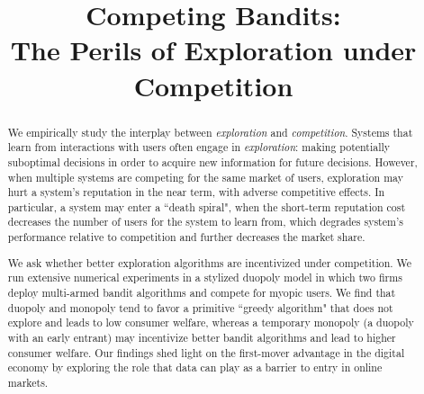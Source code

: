 \documentclass[format=acmsmall, review=false]{acmart}
\theoremstyle{definition}
\begin{document}
\title[Competing Bandits: The Perils of Exploration under Competition]
{Competing Bandits: \\ The Perils of Exploration under Competition}



\begin{abstract}
  We empirically study the interplay between \textit{exploration} and
  \textit{competition}. Systems that learn from interactions with
  users often engage in \emph{exploration}: making potentially
  suboptimal decisions in order to acquire new information for future
  decisions. However, when multiple systems are competing for
    the same market of users, exploration may hurt a system's
    reputation in the near term, with adverse competitive effects. In particular, a system may enter a ``death spiral", when the short-term reputation cost decreases
    the number of users for the system to learn from, which degrades
    system's performance relative to competition and further decreases
    the market share.

We ask whether better exploration algorithms are incentivized under competition. We run extensive numerical experiments in a stylized duopoly model in which two firms deploy multi-armed bandit algorithms and compete for myopic users.  We find that duopoly and monopoly tend to favor a primitive ``greedy algorithm" that does not explore and leads to low consumer welfare, whereas a temporary monopoly (a duopoly with an early entrant) may incentivize better bandit algorithms and lead to higher consumer welfare. Our findings shed light on the first-mover advantage in the digital economy by exploring the role that data can play as a barrier to entry in online markets.
\end{abstract}

%
%
\maketitle
{}



\newpage
















\newpage 




\end{document}
